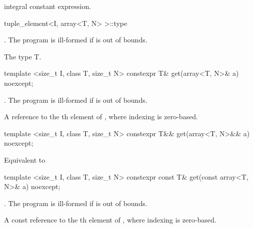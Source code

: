 \begin{itemdescr}
\pnum
\returntype   integral constant expression.

\pnum
\cvalue  {}
\end{itemdescr}

%
\begin{itemdecl}
tuple_element<I, array<T, N> >::type
\end{itemdecl}

\begin{itemdescr}
\pnum
\requires {}. The program is ill-formed if  is out of bounds.

\pnum
\cvalue  The type T.
\end{itemdescr}

%
%
\begin{itemdecl}
template <size_t I, class T, size_t N>
constexpr T& get(array<T, N>& a) noexcept;
\end{itemdecl}

\begin{itemdescr}
\pnum
\requires {}. The program is ill-formed if  is out of bounds.

\pnum
\returns  A reference to the th element of ,
where indexing is zero-based.
\end{itemdescr}

%
%
\begin{itemdecl}
template <size_t I, class T, size_t N>
constexpr T&& get(array<T, N>&& a) noexcept;
\end{itemdecl}

\begin{itemdescr}
\pnum
\effects Equivalent to 
\end{itemdescr}

%
%
\begin{itemdecl}
template <size_t I, class T, size_t N>
constexpr const T& get(const array<T, N>& a) noexcept;
\end{itemdecl}

\begin{itemdescr}
\pnum
\requires {}. The program is ill-formed if  is out of bounds.

\pnum
\returns A const reference to the th element of ,
where indexing is zero-based.
\end{itemdescr}

